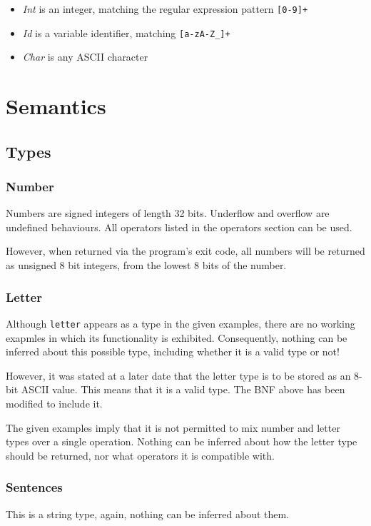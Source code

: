 \documentclass[a4paper,11pt]{article}
\begin{document}
\begin{itemize}
\item \emph{Int} is an integer, matching the regular expression pattern \verb:[0-9]+:
\item \emph{Id} is a variable identifier, matching \verb:[a-zA-Z_]+:
\item \emph{Char} is any ASCII character
\end{itemize}

\section{Semantics}
\subsection{Types}
\subsubsection{Number}
Numbers are signed integers of length 32 bits. Underflow and overflow are
undefined behaviours. All operators listed in the operators section can be
used.

However, when returned via the program's exit code, all numbers will be
returned as unsigned 8 bit integers, from the lowest 8 bits of the number.

\subsubsection{Letter}
Although \verb:letter: appears as a type in the given examples, there are no
working exapmles in which its functionality is exhibited. Consequently, nothing
can be inferred about this possible type, including whether it is a valid type
or not!

However, it was stated at a later date that the letter type is to be stored as
an 8-bit ASCII value. This means that it is a valid type. The BNF above has been
modified to include it.

The given examples imply that it is not permitted to mix number and letter types
over a single operation. Nothing can be inferred about how the letter type should
be returned, nor what operators it is compatible with.

\subsubsection{Sentences}
This is a string type, again, nothing can be inferred about them.
\end{document}
